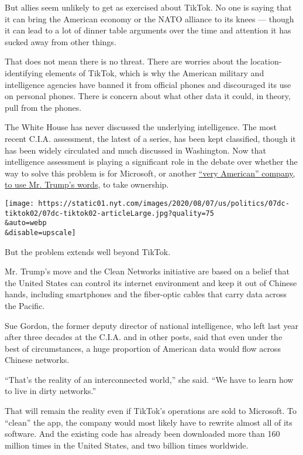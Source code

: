 But allies seem unlikely to get as exercised about TikTok. No one is
saying that it can bring the American economy or the NATO alliance to
its knees --- though it can lead to a lot of dinner table arguments over
the time and attention it has sucked away from other things.

That does not mean there is no threat. There are worries about the
location-identifying elements of TikTok, which is why the American
military and intelligence agencies have banned it from official phones
and discouraged its use on personal phones. There is concern about what
other data it could, in theory, pull from the phones.

The White House has never discussed the underlying intelligence. The
most recent C.I.A. assessment, the latest of a series, has been kept
classified, though it has been widely circulated and much discussed in
Washington. Now that intelligence assessment is playing a significant
role in the debate over whether the way to solve this problem is for
Microsoft, or another
\href{https://www.nytimes.com/2020/08/03/business/economy/trump-tiktok-china-business.html}{``very
American'' company, to use Mr. Trump's words}, to take ownership.

\texttt{[image: https://static01.nyt.com/images/2020/08/07/us/politics/07dc-tiktok02/07dc-tiktok02-articleLarge.jpg?quality=75\\\&auto=webp\\\&disable=upscale]}

But the problem extends well beyond TikTok.

Mr. Trump's move and the Clean Networks initiative are based on a belief
that the United States can control its internet environment and keep it
out of Chinese hands, including smartphones and the fiber-optic cables
that carry data across the Pacific.

Sue Gordon, the former deputy director of national intelligence, who
left last year after three decades at the C.I.A. and in other posts,
said that even under the best of circumstances, a huge proportion of
American data would flow across Chinese networks.

``That's the reality of an interconnected world,'' she said. ``We have
to learn how to live in dirty networks.''

That will remain the reality even if TikTok's operations are sold to
Microsoft. To ``clean'' the app, the company would most likely have to
rewrite almost all of its software. And the existing code has already
been downloaded more than 160 million times in the United States, and
two billion times worldwide.


